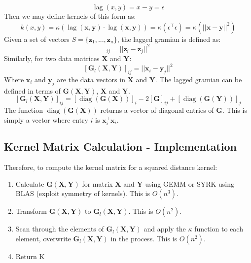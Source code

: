 \documentclass[12pt, a4paper]{article}
\DeclareMathOperator{\lag}{lag}
\DeclareMathOperator{\diag}{diag}
\begin{document}
\begin{equation*}
    \lag(x,y) = x - y = \epsilon
\end{equation*}
Then we may define kernels of this form as:
\begin{equation*}
    k(x,y) = \kappa\left(\lag(\mathbf{x},\mathbf{y})\cdot \lag(\mathbf{x}, \mathbf{y})\right)
           = \kappa\left(\epsilon^\intercal\epsilon\right)
           = \kappa\left(||\mathbf{x}-\mathbf{y}||^2\right)
\end{equation*}
Given a set of vectors $S = \{\mathbf{z}_1, ..., \mathbf{z}_n \}$, the lagged gramian is defined as:
\begin{equation*}
    [\mathbf{G}_l]_{ij} = ||\mathbf{z}_i - \mathbf{z}_j||^2
\end{equation*}
Similarly, for two data matrices $\mathbf{X}$ and $\mathbf{Y}$:
\begin{equation*}
    \left[\mathbf{G}_{l}\left(\mathbf{X}, \mathbf{Y}\right)\right]_{ij} = ||\mathbf{x}_i - \mathbf{y}_j||^2
\end{equation*}
Where $\mathbf{x}_i$ and $\mathbf{y}_j$ are the data vectors in $\mathbf{X}$ and $\mathbf{Y}$. The lagged gramian can be defined in terms of $\mathbf{G}(\mathbf{X}, \mathbf{Y})$, $\mathbf{X}$ and $\mathbf{Y}$.
\begin{equation*}
    \left[\mathbf{G}_{l}\left(\mathbf{X}, \mathbf{Y}\right)\right]_{ij} 
    = \left[\diag\left(\mathbf{G}(\mathbf{X})\right)\right]_i - 2\left[\mathbf{G}\right]_{ij} 
    + \left[\diag\left(\mathbf{G}(\mathbf{Y})\right)\right]_j
\end{equation*}
The function $\diag\left(\mathbf{G}(\mathbf{X})\right)$ returns a vector of diagonal entries of $\mathbf{G}$. This is simply a vector where entry $i$ is $\mathbf{x}_i^{\intercal}\mathbf{x}_i$. 

\subsection{Kernel Matrix Calculation - Implementation}
Therefore, to compute the kernel matrix for a squared distance kernel:
\begin{enumerate}
    \item Calculate $\mathbf{G}(\mathbf{X},\mathbf{Y})$ for matrix $\mathbf{X}$ and $\mathbf{Y}$ using GEMM or SYRK using BLAS (exploit symmetry of kernels). This is $O(n^3)$.
    \item Transform $\mathbf{G}(\mathbf{X},\mathbf{Y})$ to $\mathbf{G}_l(\mathbf{X},\mathbf{Y})$. This is $O(n^2)$.
    \item Scan through the elements of $\mathbf{G}_l(\mathbf{X},\mathbf{Y})$ and apply the $\kappa$ function to each element, overwrite $\mathbf{G}_l(\mathbf{X},\mathbf{Y})$ in the process. This is $O(n^2)$.
    \item Return K
\end{enumerate}
\end{document}
